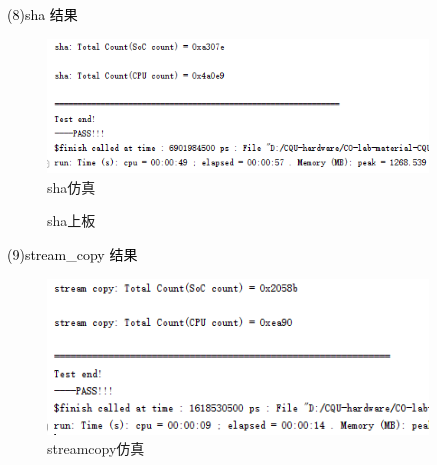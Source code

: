 \newpage
\textcolor{black}{(8)sha 结果}\\
\begin{figure}[htbp]
    \centering
    \includegraphics[width=0.9\textwidth]{image/shaS.png}
    \caption{sha仿真}
\end{figure}

\begin{figure}[htbp]
    \centering
    \caption{sha上板}
\end{figure}

\newpage
\textcolor{black}{(9)stream\_copy 结果}\\
\begin{figure}[htbp]
    \centering
    \includegraphics[width=0.9\textwidth]{image/streamcopyS.png}
    \caption{streamcopy仿真}
\end{figure}

